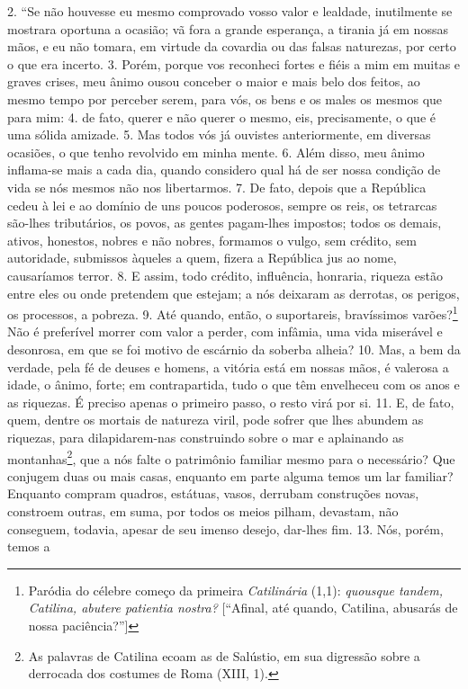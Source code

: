 2. “Se não houvesse eu mesmo comprovado vosso valor e lealdade, inutilmente se
mostrara oportuna a ocasião; vã fora a grande esperança, a tirania já em nossas
mãos, e eu não tomara, em virtude da covardia ou das falsas naturezas, por
certo o que era incerto. 3. Porém, porque vos reconheci fortes e fiéis a mim em
muitas e graves crises, meu ânimo ousou conceber o maior e mais belo dos
feitos, ao mesmo tempo por perceber serem, para vós, os bens e os males os
mesmos que para mim: 4. de fato, querer e não querer o mesmo, eis,
precisamente, o que é uma sólida amizade. 5. Mas todos vós já ouvistes
anteriormente, em diversas ocasiões, o que tenho revolvido em minha mente. 6.
Além disso, meu ânimo inflama-se mais a cada dia, quando considero qual há de
ser nossa condição de vida se nós mesmos não nos libertarmos. 7. De fato,
depois que a República cedeu à lei e ao domínio de uns poucos poderosos, sempre
os reis, os tetrarcas são-lhes tributários, os povos, as gentes pagam-lhes
impostos; todos os demais, ativos, honestos, nobres e não nobres, formamos o
vulgo, sem crédito, sem autoridade, submissos àqueles a quem, fizera a
República jus ao nome, causaríamos terror. 8. E assim, todo crédito,
influência, honraria, riqueza estão entre eles ou onde pretendem que estejam; a
nós deixaram as derrotas, os perigos, os processos, a pobreza. 9. Até quando,
então, o suportareis, bravíssimos varões?\footnote{Paródia do célebre começo da
primeira \emph{Catilinária} (1,1): \emph{quousque tandem, Catilina, abutere
patientia nostra?} [``Afinal, até quando, Catilina, abusarás de nossa
paciência?'']} Não é preferível morrer com valor a perder, com infâmia, uma
vida miserável e desonrosa, em que se foi motivo de escárnio da soberba alheia?
10. Mas, a bem da verdade, pela fé de deuses e homens, a vitória está em nossas
mãos, é valerosa a idade, o ânimo, forte; em contrapartida, tudo o que têm
envelheceu com os anos e as riquezas. É preciso apenas o primeiro passo, o
resto virá por si. 11. E, de fato, quem, dentre os mortais de natureza viril,
pode sofrer que lhes abundem as riquezas, para dilapidarem-nas construindo
sobre o mar e aplainando as montanhas\footnote{As palavras de Catilina ecoam as
de Salústio, em sua digressão sobre a derrocada dos costumes de Roma (XIII,
1).}, que a nós falte o patrimônio familiar mesmo para o necessário? Que
conjugem duas ou mais casas, enquanto em parte alguma temos um lar familiar?
Enquanto compram quadros, estátuas, vasos, derrubam construções novas,
constroem outras, em suma, por todos os meios pilham, devastam, não conseguem,
todavia, apesar de seu imenso desejo, dar-lhes fim. 13. Nós, porém, temos a
